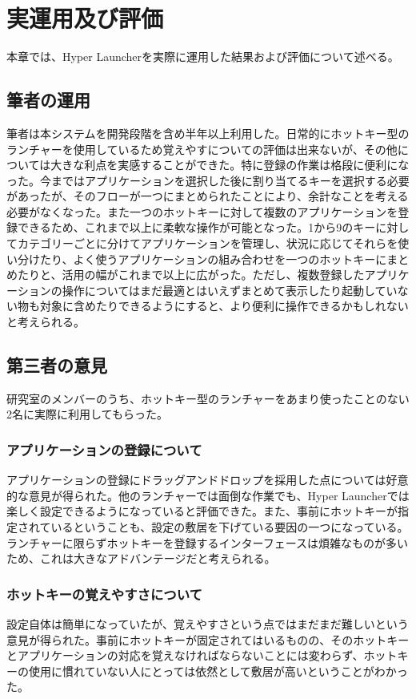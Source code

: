 \chapter{実運用及び評価}
本章では、Hyper Launcherを実際に運用した結果および評価について述べる。

\newpage

\section{筆者の運用}
筆者は本システムを開発段階を含め半年以上利用した。日常的にホットキー型のランチャーを使用しているため覚えやすについての評価は出来ないが、その他については大きな利点を実感することができた。特に登録の作業は格段に便利になった。今まではアプリケーションを選択した後に割り当てるキーを選択する必要があったが、そのフローが一つにまとめられたことにより、余計なことを考える必要がなくなった。また一つのホットキーに対して複数のアプリケーションを登録できるため、これまで以上に柔軟な操作が可能となった。1から9のキーに対してカテゴリーごとに分けてアプリケーションを管理し、状況に応じてそれらを使い分けたり、よく使うアプリケーションの組み合わせを一つのホットキーにまとめたりと、活用の幅がこれまで以上に広がった。ただし、複数登録したアプリケーションの操作についてはまだ最適とはいえずまとめて表示したり起動していない物も対象に含めたりできるようにすると、より便利に操作できるかもしれないと考えられる。

\section{第三者の意見}
研究室のメンバーのうち、ホットキー型のランチャーをあまり使ったことのない2名に実際に利用してもらった。

\subsection{アプリケーションの登録について}
アプリケーションの登録にドラッグアンドドロップを採用した点については好意的な意見が得られた。他のランチャーでは面倒な作業でも、Hyper Launcherでは楽しく設定できるようになっていると評価できた。また、事前にホットキーが指定されているということも、設定の敷居を下げている要因の一つになっている。ランチャーに限らずホットキーを登録するインターフェースは煩雑なものが多いため、これは大きなアドバンテージだと考えられる。

\subsection{ホットキーの覚えやすさについて}
設定自体は簡単になっていたが、覚えやすさという点ではまだまだ難しいという意見が得られた。事前にホットキーが固定されてはいるものの、そのホットキーとアプリケーションの対応を覚えなければならないことには変わらず、ホットキーの使用に慣れていない人にとっては依然として敷居が高いということがわかった。

